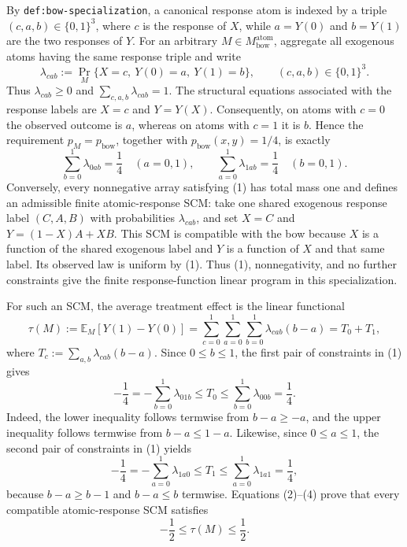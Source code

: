 By \texttt{def:bow-specialization}, a canonical response atom is indexed by a triple \((c,a,b)\in\{0,1\}^3\), where \(c\) is the response of \(X\), while \(a=Y(0)\) and \(b=Y(1)\) are the two responses of \(Y\).  For an arbitrary \(M\in M_{\mathrm{bow}}^{\mathrm{atom}}\), aggregate all exogenous atoms having the same response triple and write
\[
  \lambda_{cab}:=\Pr_M\{X=c,\ Y(0)=a,\ Y(1)=b\},
  \qquad (c,a,b)\in\{0,1\}^3.
\]
Thus \(\lambda_{cab}\ge 0\) and \(\sum_{c,a,b}\lambda_{cab}=1\).  The structural equations associated with the response labels are \(X=c\) and \(Y=Y(X)\).  Consequently, on atoms with \(c=0\) the observed outcome is \(a\), whereas on atoms with \(c=1\) it is \(b\).  Hence the requirement \(p_M=p_{\mathrm{bow}}\), together with \(p_{\mathrm{bow}}(x,y)=1/4\), is exactly
\[
  \sum_{b=0}^1\lambda_{0ab}=\frac14
  \quad(a=0,1),
  \qquad
  \sum_{a=0}^1\lambda_{1ab}=\frac14
  \quad(b=0,1).
  \tag{1}
\]
Conversely, every nonnegative array satisfying (1) has total mass one and defines an admissible finite atomic-response SCM: take one shared exogenous response label \((C,A,B)\) with probabilities \(\lambda_{cab}\), and set \(X=C\) and \(Y=(1-X)A+XB\).  This SCM is compatible with the bow because \(X\) is a function of the shared exogenous label and \(Y\) is a function of \(X\) and that same label.  Its observed law is uniform by (1).  Thus (1), nonnegativity, and no further constraints give the finite response-function linear program in this specialization.

For such an SCM, the average treatment effect is the linear functional
\[
  \tau(M):=\mathbb E_M[Y(1)-Y(0)]
  =\sum_{c=0}^1\sum_{a=0}^1\sum_{b=0}^1
    \lambda_{cab}(b-a)
  =T_0+T_1,
  \tag{2}
\]
where \(T_c:=\sum_{a,b}\lambda_{cab}(b-a)\).  Since \(0\le b\le 1\), the first pair of constraints in (1) gives
\[
  -\frac14
  =-\sum_{b=0}^1\lambda_{01b}
  \le T_0
  \le \sum_{b=0}^1\lambda_{00b}
  =\frac14.
  \tag{3}
\]
Indeed, the lower inequality follows termwise from \(b-a\ge -a\), and the upper inequality follows termwise from \(b-a\le 1-a\).  Likewise, since \(0\le a\le 1\), the second pair of constraints in (1) yields
\[
  -\frac14
  =-\sum_{a=0}^1\lambda_{1a0}
  \le T_1
  \le \sum_{a=0}^1\lambda_{1a1}
  =\frac14,
  \tag{4}
\]
because \(b-a\ge b-1\) and \(b-a\le b\) termwise.  Equations (2)--(4) prove that every compatible atomic-response SCM satisfies
\[
  -\frac12\le \tau(M)\le\frac12.
  \tag{5}
\]


